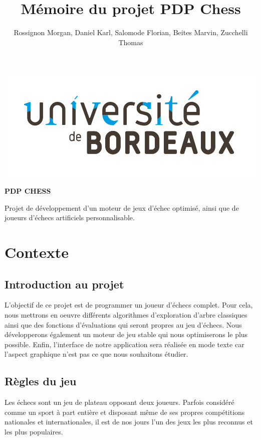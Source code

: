 \huge\documentclass{article}
\title{\textbf{Mémoire du projet PDP Chess}}
\author{Rossignon Morgan, Daniel Karl, Salomode Florian, Beites Marvin, Zucchelli Thomas}
\begin{document}
    \maketitle
    \centerline{\includegraphics[scale = 0.5]{img/Universite Bordeaux RVB-02.jpg}}

    \huge \centerline{\textbf{PDP CHESS}}

    \medskip
    Projet de développement d'un moteur de jeux d'échec optimisé, ainsi que de joueurs d'échecs artificiels personnalisable.
    \normalsize
    \newpage

    \tableofcontents
    \newpage

    \section{Contexte}

    \subsection{Introduction au projet}

    L'objectif de ce projet est de programmer un joueur d'échecs complet.
    \newline
    Pour cela, nous mettrons en oeuvre différents algorithmes d'exploration d'arbre classiques ainsi que des fonctions d'évaluations qui seront propres au jeu d'échecs. Nous développerons également un moteur de jeu stable qui nous optimiserons le plus possible.
    \newline
    Enfin, l'interface de notre application sera réalisée en mode texte car l'aspect graphique n'est pas ce que nous souhaitons étudier.

    \subsection{Règles du jeu}

    Les échecs sont un jeu de plateau opposant deux joueurs. Parfois considéré comme un sport à part entière et disposant même de ses propres compétitions nationales et internationales, il est de nos jours l'un des jeux les plus reconnus et les plus populaires.
\end{document}
